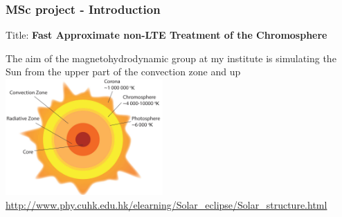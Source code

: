 \frame
{
	\frametitle{MSc project - Introduction}
    \large{Title: \textbf{Fast Approximate non-LTE Treatment of the Chromosphere}}
	\begin{itemize}
	\large{
		\item The aim of the magnetohydrodynamic group at my institute is  simulating the Sun from the upper part of the convection zone and up 
		\vspace{1em}
		\\
			\centering 
	\includegraphics[width=60mm]{images/sun_structure}
	\url{http://www.phy.cuhk.edu.hk/elearning/Solar_eclipse/Solar_structure.html}



	}
	\end{itemize}
}

